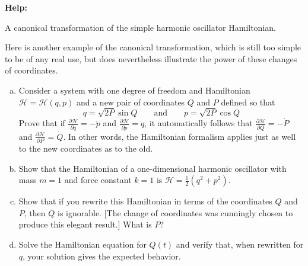 \documentclass[11pt,letterpaper,boxed]{../hmcpsetrhino}
\newcommand{\half}{\frac{1}{2}}
\newcommand\pd[2]{\frac{\partial #1}{\partial #2}}
\def\Ham{\mathcal{H}}
\begin{document}
\textbf{Help:}

\begin{problem}[i]
A canonical transformation of the simple harmonic oscillator Hamiltonian.

\begin{problem}[13.25]
Here is another example of the canonical transformation, which is still too simple to be of any real use, but does nevertheless illustrate the power of these changes of coordinates.

\begin{enumerate}[(a)]
\item Consider a system with one degree of freedom and Hamiltonian $\Ham = \Ham(q,p)$ and a new pair of coordinates $Q$ and $P$ defined so that
\[	q = \sqrt{2P} \sin Q \qquad \text{and} \qquad p = \sqrt{2P} \cos Q\]
Prove that if $\pd \Ham q = -\dot p$ and $\pd \Ham p = \dot q$, it automatically follows that $\pd \Ham Q = -\dot P$ and $\pd \Ham P = \dot Q$. In other words, the Hamiltonian formalism applies just as well to the new coordinates as to the old. 
\item Show that the Hamiltonian of a one-dimensional harmonic oscillator with mass $m = 1$ and force constant $k = 1$ is $\Ham = \half( q^2 + p^2)$.

\item Show that if you rewrite this Hamiltonian in terms of the coordinates $Q$ and $P$, then $Q$ is ignorable. [The change of coordinates was cunningly chosen to produce this elegant result.] What is $P$? 

\item Solve the Hamiltonian equation for $Q(t)$ and verify that, when rewritten for $q$, your solution gives the expected behavior.
\end{enumerate}
\end{problem}
\end{problem}
\begin{solution}


\vfill
\end{solution}


\newpage
\end{document}
